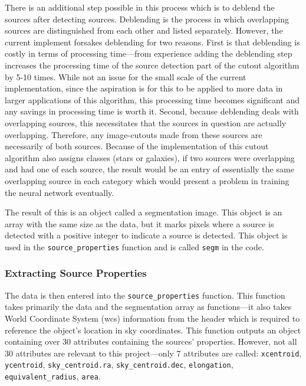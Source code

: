 \documentclass[a4paper,fleqn,usenatbib]{mnras}
\begin{document}
There is an additional step possible in this process which is to deblend the sources after detecting sources. Deblending is the process in which overlapping sources are distinguished from each other and listed separately. However, the current implement forsakes deblending for two reasons. First is that deblending is costly in terms of processing time---from experience adding the deblending step increases the processing time of the source detection part of the cutout algorithm by 5-10 times. While not an issue for the small scale of the current implementation, since the aspiration is for this to be applied to more data in larger applications of this algorithm, this processing time becomes significant and any savings in processing time is worth it. Second, because deblending deals with overlapping sources, this necessitates that the sources in question are actually overlapping. Therefore, any image-cutouts made from these sources are necessarily of both sources. Because of the implementation of this cutout algorithm also assigns classes (stars or galaxies), if two sources were overlapping and had one of each source, the result would be an entry of essentially the same overlapping source in each category which would present a problem in training the neural network eventually. 

The result of this is an object called a segmentation image. This object is an array with the same size as the data, but it marks pixels where a source is detected with a positive integer to indicate a source is detected.  This object is used in the \texttt{source\_properties} function and is called \texttt{segm} in the code. 

\subsubsection{Extracting Source Properties}
The data is then entered into the \texttt{source\_properties} function. This function takes primarily the data and the segmentation array as functions---it also takes World Coordinate System (wcs) information from the header which is required to reference the object's location in sky coordinates. This function outputs an object containing over 30 attributes containing the sources' properties. However, not all 30 attributes are relevant to this project---only 7 attributes are called: \texttt{xcentroid}, \texttt{ycentroid}, \texttt{sky\_centroid.ra}, \texttt{sky\_centroid.dec}, \texttt{elongation}, \lstinline{equivalent_radius}, \texttt{area}. 
\end{document}
